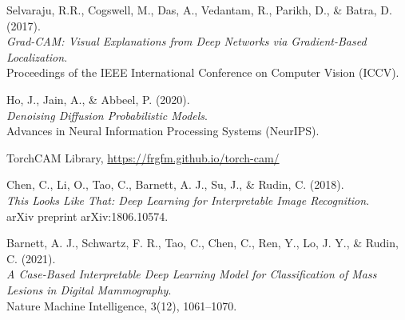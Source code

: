 \documentclass{article}
\begin{document}
\begin{thebibliography}{9}

Selvaraju, R.R., Cogswell, M., Das, A., Vedantam, R., Parikh, D., \& Batra, D. (2017).\\
\textit{Grad-CAM: Visual Explanations from Deep Networks via Gradient-Based Localization}.\\
Proceedings of the IEEE International Conference on Computer Vision (ICCV).

Ho, J., Jain, A., \& Abbeel, P. (2020).\\
\textit{Denoising Diffusion Probabilistic Models}.\\
Advances in Neural Information Processing Systems (NeurIPS).

TorchCAM Library, \url{https://frgfm.github.io/torch-cam/}

Chen, C., Li, O., Tao, C., Barnett, A. J., Su, J., \& Rudin, C. (2018).\\
\textit{This Looks Like That: Deep Learning for Interpretable Image Recognition}.\\
arXiv preprint arXiv:1806.10574.

Barnett, A. J., Schwartz, F. R., Tao, C., Chen, C., Ren, Y., Lo, J. Y., \& Rudin, C. (2021).\\
\textit{A Case-Based Interpretable Deep Learning Model for Classification of Mass Lesions in Digital Mammography}.\\
Nature Machine Intelligence, 3(12), 1061--1070.

\end{thebibliography}
\end{document}
